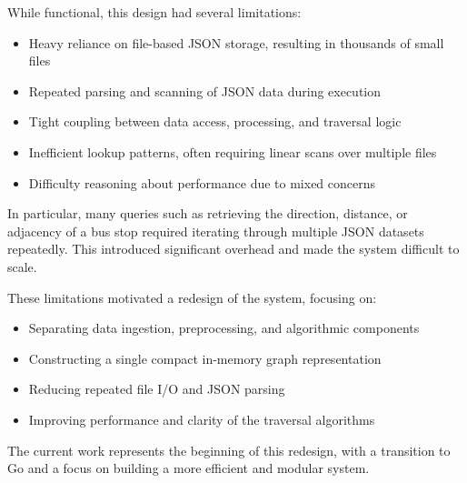 \documentclass[11pt,a4paper]{article}
\begin{document}
While functional, this design had several limitations:

\begin{itemize}
    \item Heavy reliance on file-based JSON storage, resulting in thousands of small files
    \item Repeated parsing and scanning of JSON data during execution
    \item Tight coupling between data access, processing, and traversal logic
    \item Inefficient lookup patterns, often requiring linear scans over multiple files
    \item Difficulty reasoning about performance due to mixed concerns
\end{itemize}

In particular, many queries such as retrieving the direction, distance, or adjacency
of a bus stop required iterating through multiple JSON datasets repeatedly. This
introduced significant overhead and made the system difficult to scale.

These limitations motivated a redesign of the system, focusing on:

\begin{itemize}
    \item Separating data ingestion, preprocessing, and algorithmic components
    \item Constructing a single compact in-memory graph representation
    \item Reducing repeated file I/O and JSON parsing
    \item Improving performance and clarity of the traversal algorithms
\end{itemize}

The current work represents the beginning of this redesign, with a transition to Go
and a focus on building a more efficient and modular system.
\end{document}
